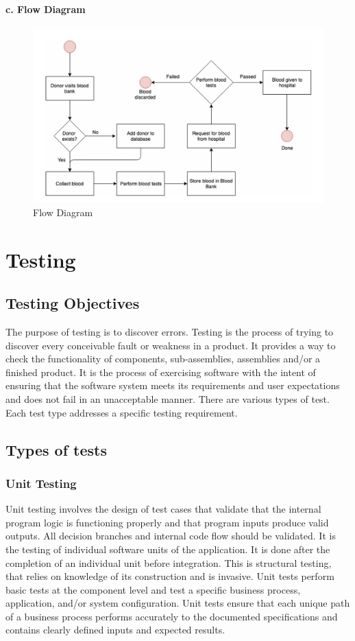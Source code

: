 \documentclass[BTech]{srmuthesis}
\begin{document}
\subsubsection{c. Flow Diagram}
\begin{figure}[H]
	\centering
	\includegraphics[scale=0.6]{flow_diag.png}
	\caption{Flow Diagram}
\end{figure}

\chapter{Testing}
\section{Testing Objectives}
The purpose of testing is to discover errors. Testing is the process of trying to discover every conceivable fault or weakness in a product. It provides a way to check the functionality of components, sub-assemblies, assemblies and/or a finished product. It is the process of exercising software with the intent of ensuring that the software system meets its requirements and user expectations and does not fail in an unacceptable manner. There are various types of test. Each test type addresses a specific testing requirement. \cite{testing_book}
\section{Types of tests}
\subsection{Unit Testing}
Unit testing involves the design of test cases that validate that the internal program logic is functioning properly and that program inputs produce valid outputs. All decision branches and internal code flow should be validated. It is the testing of individual software units of the application. It is done after the completion of an individual unit before integration. This is structural testing, that relies on knowledge of its construction and is invasive. Unit tests perform basic tests at the component level and test a specific business process, application, and/or system configuration. Unit tests ensure that each unique path of a business process performs accurately to the documented specifications and contains clearly defined inputs and expected results.
\end{document}
